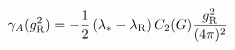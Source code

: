 \begin{equation}
 \gamma_A(g_{\rm R}^2)  %
 =- \frac{1}{2} \left( \lambda_{*}- \lambda_{\rm R} \right) C_2(G)
  \frac{g_{\rm R}^2}{(4\pi)^2}  
\label{adimgluon}
\end{equation}

